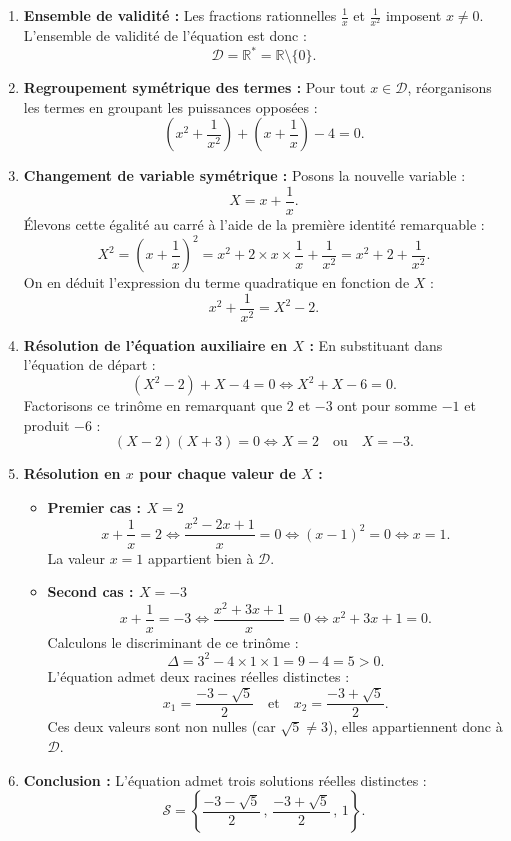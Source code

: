 \documentclass[11pt,a4paper]{article}
\newcommand{\R}{\mathbb{R}}
\begin{document}
\begin{correctionbox}
\begin{enumerate}
    \item \textbf{Ensemble de validité :}
    Les fractions rationnelles $\frac{1}{x}$ et $\frac{1}{x^2}$ imposent $x \neq 0$.
    L'ensemble de validité de l'équation est donc :
    \[
    \mathcal{D} = \R^* = \R \setminus \{0\}.
    \]

    \item \textbf{Regroupement symétrique des termes :}
    Pour tout $x \in \mathcal{D}$, réorganisons les termes en groupant les puissances opposées :
    \[
    \left(x^2 + \frac{1}{x^2}\right) + \left(x + \frac{1}{x}\right) - 4 = 0.
    \]

    \item \textbf{Changement de variable symétrique :}
    Posons la nouvelle variable :
    \[
    X = x + \frac{1}{x}.
    \]
    Élevons cette égalité au carré à l'aide de la première identité remarquable :
    \[
    X^2 = \left(x + \frac{1}{x}\right)^2 = x^2 + 2 \times x \times \frac{1}{x} + \frac{1}{x^2} = x^2 + 2 + \frac{1}{x^2}.
    \]
    On en déduit l'expression du terme quadratique en fonction de $X$ :
    \[
    x^2 + \frac{1}{x^2} = X^2 - 2.
    \]

    \item \textbf{Résolution de l'équation auxiliaire en $X$ :}
    En substituant dans l'équation de départ :
    \[
    (X^2 - 2) + X - 4 = 0 \iff X^2 + X - 6 = 0.
    \]
    Factorisons ce trinôme en remarquant que $2$ et $-3$ ont pour somme $-1$ et produit $-6$ :
    \[
    (X - 2)(X + 3) = 0 \iff X = 2 \quad \text{ou} \quad X = -3.
    \]

    \item \textbf{Résolution en $x$ pour chaque valeur de $X$ :}
    \begin{itemize}
        \item \textbf{Premier cas : $X = 2$}
        \[
        x + \frac{1}{x} = 2 \iff \frac{x^2 - 2x + 1}{x} = 0 \iff (x - 1)^2 = 0 \iff x = 1.
        \]
        La valeur $x = 1$ appartient bien à $\mathcal{D}$.
        \item \textbf{Second cas : $X = -3$}
        \[
        x + \frac{1}{x} = -3 \iff \frac{x^2 + 3x + 1}{x} = 0 \iff x^2 + 3x + 1 = 0.
        \]
        Calculons le discriminant de ce trinôme :
        \[
        \Delta = 3^2 - 4 \times 1 \times 1 = 9 - 4 = 5 > 0.
        \]
        L'équation admet deux racines réelles distinctes :
        \[
        x_1 = \frac{-3 - \sqrt{5}}{2} \quad \text{et} \quad x_2 = \frac{-3 + \sqrt{5}}{2}.
        \]
        Ces deux valeurs sont non nulles (car $\sqrt{5} \neq 3$), elles appartiennent donc à $\mathcal{D}$.
    \end{itemize}

    \item \textbf{Conclusion :}
    L'équation admet trois solutions réelles distinctes :
    \[
    \mathcal{S} = \left\{ \frac{-3 - \sqrt{5}}{2}\,,\, \frac{-3 + \sqrt{5}}{2}\,,\, 1 \right\}.
    \]
\end{enumerate}
\end{correctionbox}
\end{document}

